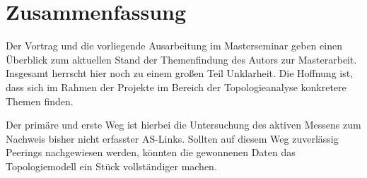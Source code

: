 \section{Zusammenfassung}\label{sec:schluss}
Der Vortrag und die vorliegende Ausarbeitung im Masterseminar geben einen Überblick zum aktuellen Stand der Themenfindung des Autors zur Masterarbeit.
Insgesamt herrscht hier noch zu einem großen Teil Unklarheit.
Die Hoffnung ist, dass sich im Rahmen der Projekte im Bereich der Topologieanalyse konkretere Themen finden.

Der primäre und erste Weg ist hierbei die Untersuchung des aktiven Messens zum Nachweis bisher nicht erfasster AS-Links.
Sollten auf diesem Weg zuverlässig Peerings nachgewiesen werden, könnten die gewonnenen Daten das Topologiemodell ein Stück vollständiger machen.



